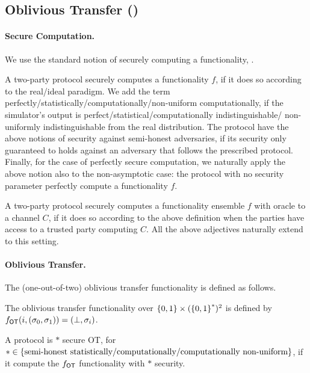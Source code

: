 \subsection{Oblivious Transfer (\OT)}

\paragraph{Secure Computation.}
We use the standard notion of securely computing a functionality, \cf  \cite{Goldreich04}.
\begin{definition}\label{def:SFE}
	A two-party protocol {\sf securely computes a functionality $f$}, if it does so according to the real/ideal paradigm.   We add the term perfectly/statistically/computationally/non-uniform computationally, if the simulator's output is  perfect/statistical/computationally indistinguishable/  non-uniformly indistinguishable from  the real distribution.  The protocol have the above notions of security {\sf against semi-honest  adversaries}, if its security only  guaranteed to holds against an adversary that follows the prescribed protocol.   Finally, for the case of perfectly secure computation, we naturally apply the above notion also to the non-asymptotic case: the protocol with no security parameter perfectly  compute a functionality $f$.
	
	A two-party protocol {\sf securely computes a functionality ensemble $f$ with oracle to a channel $C$}, if it does so according to the above definition when the parties have access to a trusted party computing $C$. All the above adjectives naturally extend to this setting.
\end{definition}

\paragraph{Oblivious Transfer.}
The (one-out-of-two) oblivious transfer functionality is defined as follows.
\begin{definition}\label{def:OTfunc}
	The oblivious transfer functionality over $\zo \times (\zs)^2$ is defined by  $f_{{\sf OT}} (i,(\sigma_0,\sigma_1)) = (\perp,\sigma_i)$.
\end{definition}
A protocol is $\ast$ secure OT,   for \\$\ast\in \set{\text{semi-honest statistically/computationally/computationally non-uniform}}$, if it  compute the $f_{{\sf OT}}$  functionality with $\ast$ security.





